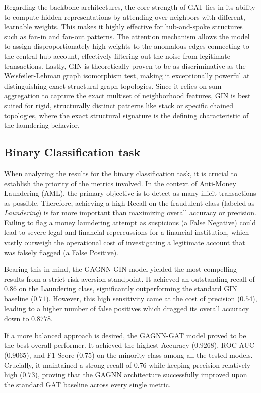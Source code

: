 Regarding the backbone architectures, the core strength of GAT lies in its ability to compute hidden representations by attending over neighbors with different, learnable weights. This makes it highly effective for hub-and-spoke structures such as fan-in and fan-out patterns. The attention mechanism allows the model to assign disproportionately high weights to the anomalous edges connecting to the central hub account, effectively filtering out the noise from legitimate transactions. Lastly, GIN is theoretically proven to be as discriminative as the Weisfeiler-Lehman graph isomorphism test, making it exceptionally powerful at distinguishing exact structural graph topologies. Since it relies on sum-aggregation to capture the exact multiset of neighborhood features, GIN is best suited for rigid, structurally distinct patterns like stack or specific chained topologies, where the exact structural signature is the defining characteristic of the laundering behavior.

\subsection{Binary Classification task}

When analyzing the results for the binary classification task, it is crucial to establish the priority of the metrics involved. In the context of Anti-Money Laundering (AML), the primary objective is to detect as many illicit transactions as possible. Therefore, achieving a high Recall on the fraudulent class (labeled as \textit{Laundering}) is far more important than maximizing overall accuracy or precision. Failing to flag a money laundering attempt as suspicious (a False Negative) could lead to severe legal and financial repercussions for a financial institution, which vastly outweigh the operational cost of investigating a legitimate account that was falsely flagged (a False Positive).

Bearing this in mind, the GAGNN-GIN model yielded the most compelling results from a strict risk-aversion standpoint. It achieved an outstanding recall of \(0.86\) on the Laundering class, significantly outperforming the standard GIN baseline (\(0.71\)). However, this high sensitivity came at the cost of precision (\(0.54\)), leading to a higher number of false positives which dragged its overall accuracy down to \(0.8778\). 

If a more balanced approach is desired, the GAGNN-GAT model proved to be the best overall performer. It achieved the highest Accuracy (\(0.9268\)), ROC-AUC (\(0.9065\)), and F1-Score (\(0.75\)) on the minority class among all the tested models. Crucially, it maintained a strong recall of \(0.76\) while keeping precision relatively high (\(0.73\)), proving that the GAGNN architecture successfully improved upon the standard GAT baseline across every single metric.

